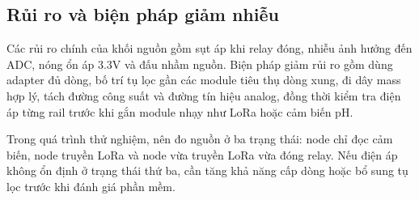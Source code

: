\subsection{Rủi ro và biện pháp giảm nhiễu}
Các rủi ro chính của khối nguồn gồm sụt áp khi relay đóng, nhiễu ảnh hưởng đến ADC, nóng ổn áp 3.3V và đấu nhầm nguồn. Biện pháp giảm rủi ro gồm dùng adapter đủ dòng, bố trí tụ lọc gần các module tiêu thụ dòng xung, đi dây mass hợp lý, tách đường công suất và đường tín hiệu analog, đồng thời kiểm tra điện áp từng rail trước khi gắn module nhạy như LoRa hoặc cảm biến pH.

Trong quá trình thử nghiệm, nên đo nguồn ở ba trạng thái: node chỉ đọc cảm biến, node truyền LoRa và node vừa truyền LoRa vừa đóng relay. Nếu điện áp không ổn định ở trạng thái thứ ba, cần tăng khả năng cấp dòng hoặc bổ sung tụ lọc trước khi đánh giá phần mềm.
